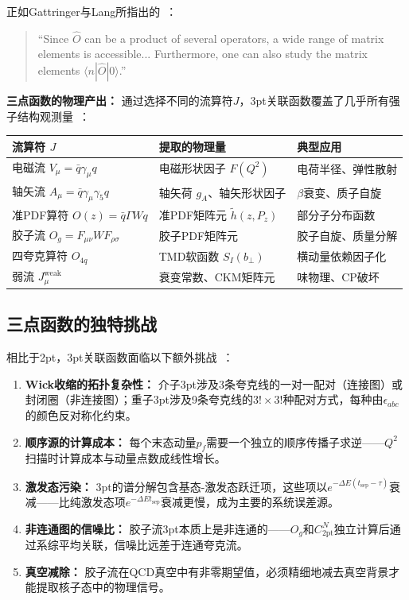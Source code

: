 \documentclass[12pt,a4paper]{ctexart}
\theoremstyle{definition}
\begin{document}
正如Gattringer与Lang所指出的~\cite{GattringerLang2010}：
\begin{quote}
``Since $\hat{O}$ can be a product of several operators, a wide range of matrix elements is accessible... Furthermore, one can also study the matrix elements $\langle n|\hat{O}|0\rangle$.''
\end{quote}

\textbf{三点函数的物理产出：} 通过选择不同的流算符$J$，3pt关联函数覆盖了几乎所有强子结构观测量~\cite{GattringerLang2010,correlationFunctions2026,formFactors2026}：
\begin{center}
\begin{tabular}{lll}
\toprule
\textbf{流算符 $J$} & \textbf{提取的物理量} & \textbf{典型应用} \\
\midrule
电磁流 $V_\mu = \bar{q}\gamma_\mu q$ & 电磁形状因子 $F(Q^2)$ & 电荷半径、弹性散射 \\
轴矢流 $A_\mu = \bar{q}\gamma_\mu\gamma_5 q$ & 轴矢荷 $g_A$、轴矢形状因子 & $\beta$衰变、质子自旋 \\
准PDF算符 $O(z) = \bar{q}\Gamma W q$ & 准PDF矩阵元 $\tilde{h}(z,P_z)$ & 部分子分布函数 \\
胶子流 $O_g = F_{\mu\nu}W F_{\rho\sigma}$ & 胶子PDF矩阵元 & 胶子自旋、质量分解 \\
四夸克算符 $O_{4q}$ & TMD软函数 $S_I(b_\perp)$ & 横动量依赖因子化 \\
弱流 $J_\mu^{\text{weak}}$ & 衰变常数、CKM矩阵元 & 味物理、CP破坏 \\
\toprule
\end{tabular}
\end{center}

\subsection{三点函数的独特挑战}

相比于2pt，3pt关联函数面临以下额外挑战~\cite{correlationFunctions2026,gluonQuasiOpReport2026}：

\begin{enumerate}[leftmargin=*]
    \item \textbf{Wick收缩的拓扑复杂性：} 介子3pt涉及3条夸克线的一对一配对（连接图）或封闭圈（非连接图）；重子3pt涉及9条夸克线的$3! \times 3!$种配对方式，每种由$\epsilon_{abc}$的颜色反对称化约束。
    \item \textbf{顺序源的计算成本：} 每个末态动量$p_f$需要一个独立的顺序传播子求逆——$Q^2$扫描时计算成本与动量点数成线性增长。
    \item \textbf{激发态污染：} 3pt的谱分解包含基态-激发态跃迁项，这些项以$e^{-\Delta E(t_{\text{sep}}-\tau)}$衰减——比纯激发态项$e^{-\Delta E t_{\text{sep}}}$衰减更慢，成为主要的系统误差源。
    \item \textbf{非连通图的信噪比：} 胶子流3pt本质上是非连通的——$O_g$和$C_{2\text{pt}}^N$独立计算后通过系综平均关联，信噪比远差于连通夸克流。
    \item \textbf{真空减除：} 胶子流在QCD真空中有非零期望值，必须精细地减去真空背景才能提取核子态中的物理信号。
\end{enumerate}
\end{document}
